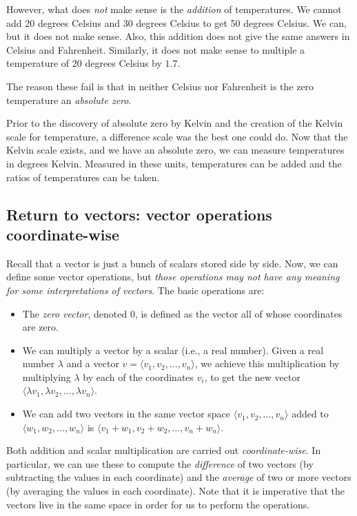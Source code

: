 \documentclass[10pt]{amsart}
\begin{document}
However, what does {\em not} make sense is the {\em addition} of
temperatures. We cannot add 20 degrees Celsius and 30 degrees Celsius
to get 50 degrees Celsius. We can, but it does not make sense. Also,
this addition does not give the same answers in Celsius and
Fahrenheit. Similarly, it does not make sense to multiple a
temperature of 20 degrees Celsius by $1.7$.

The reason these fail is that in neither Celsius nor Fahrenheit is the
zero temperature an {\em absolute zero}.

Prior to the discovery of absolute zero by Kelvin and the creation of
the Kelvin scale for temperature, a difference scale was the best one
could do. Now that the Kelvin scale exists, and we have an absolute
zero, we can measure temperatures in degrees Kelvin. Measured in these
units, temperatures can be added and the ratios of temperatures can be
taken.

\subsection{Return to vectors: vector operations coordinate-wise}

Recall that a vector is just a bunch of scalars stored side by
side. Now, we can define some vector operations, but {\em those
operations may not have any meaning for some interpretations of
vectors}. The basic operations are:

\begin{itemize}
\item The {\em zero vector}, denoted $0$, is defined as the vector all
  of whose coordinates are zero.
\item We can multiply a vector by a scalar (i.e., a real
  number). Given a real number $\lambda$ and a vector $v = \langle
  v_1, v_2, \dots, v_n \rangle$, we achieve this multiplication by
  multiplying $\lambda$ by each of the coordinates $v_i$, to get the
  new vector $\langle \lambda v_1, \lambda v_2, \dots, \lambda v_n
  \rangle$.
\item We can add two vectors in the same vector space $\langle
  v_1,v_2,\dots,v_n \rangle$ added to $\langle w_1,w_2,\dots,w_n
  \rangle$ is $\langle v_1 + w_1,v_2 + w_2,\dots, v_n+w_n \rangle$.
\end{itemize}

Both addition and scalar multiplication are carried out {\em
coordinate-wise}. In particular, we can use these to compute the {\em
difference} of two vectors (by subtracting the values in each
coordinate) and the {\em average} of two or more vectors (by averaging
the values in each coordinate). Note that it is imperative that the
vectors live in the same space in order for us to perform the
operations.
\end{document}
